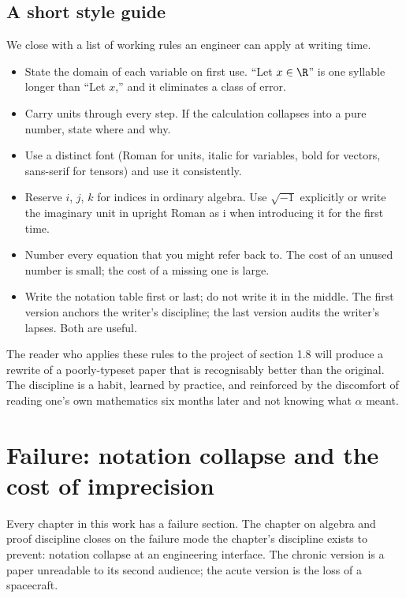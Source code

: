 \subsection{A short style guide}

We close with a list of working rules an engineer can apply at
writing time.

\begin{itemize}[leftmargin=*]
  \item State the domain of each variable on first use. ``Let $x \in
    \R$'' is one syllable longer than ``Let $x$,'' and it eliminates
    a class of error.
  \item Carry units through every step. If the calculation collapses
    into a pure number, state where and why.
  \item Use a distinct font (Roman for units, italic for variables,
    bold for vectors, sans-serif for tensors) and use it consistently.
  \item Reserve $i$, $j$, $k$ for indices in ordinary algebra.
    Use $\sqrt{-1}$ explicitly or write the imaginary unit in upright
    Roman as $\mathrm{i}$ when introducing it for the first time.
  \item Number every equation that you might refer back to. The cost
    of an unused number is small; the cost of a missing one is
    large.
  \item Write the notation table first or last; do not write it in
    the middle. The first version anchors the writer's discipline;
    the last version audits the writer's lapses. Both are useful.
\end{itemize}

The reader who applies these rules to the project of section 1.8
will produce a rewrite of a poorly-typeset paper that is recognisably
better than the original. The discipline is a habit, learned by
practice, and reinforced by the discomfort of reading one's own
mathematics six months later and not knowing what $\alpha$ meant.

\section{Failure: notation collapse and the cost of imprecision}

Every chapter in this work has a failure section. The chapter on
algebra and proof discipline closes on the failure mode the chapter's
discipline exists to prevent: notation collapse at an engineering
interface. The chronic version is a paper unreadable to its second
audience; the acute version is the loss of a spacecraft.

